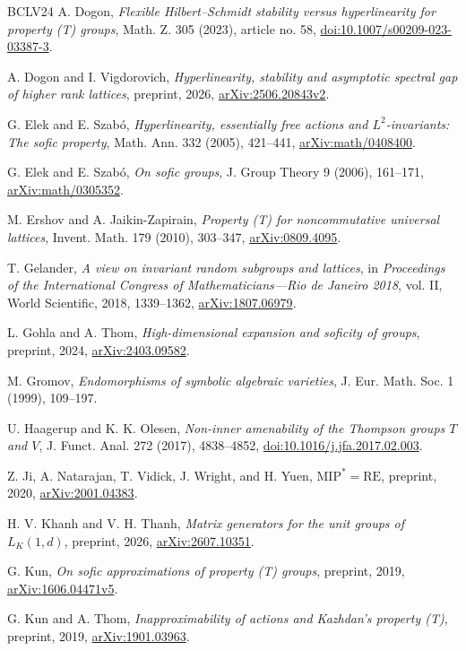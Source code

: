 \documentclass[10pt]{article}
\begin{document}
\begin{thebibliography}{BCLV24}
A. Dogon, \emph{Flexible Hilbert--Schmidt stability versus hyperlinearity for property (T) groups}, Math. Z. 305 (2023), article no. 58, \url{doi:10.1007/s00209-023-03387-3}.

A. Dogon and I. Vigdorovich, \emph{Hyperlinearity, stability and asymptotic spectral gap of higher rank lattices}, preprint, 2026, \url{arXiv:2506.20843v2}.

G. Elek and E. Szabó, \emph{Hyperlinearity, essentially free actions and $L^2$-invariants: The sofic property}, Math. Ann. 332 (2005), 421--441, \url{arXiv:math/0408400}.

G. Elek and E. Szabó, \emph{On sofic groups}, J. Group Theory 9 (2006), 161--171, \url{arXiv:math/0305352}.

M. Ershov and A. Jaikin-Zapirain, \emph{Property (T) for noncommutative universal lattices}, Invent. Math. 179 (2010), 303--347, \url{arXiv:0809.4095}.

T. Gelander, \emph{A view on invariant random subgroups and lattices}, in \emph{Proceedings of the International Congress of Mathematicians---Rio de Janeiro 2018}, vol. II, World Scientific, 2018, 1339--1362, \url{arXiv:1807.06979}.

L. Gohla and A. Thom, \emph{High-dimensional expansion and soficity of groups}, preprint, 2024, \url{arXiv:2403.09582}.

M. Gromov, \emph{Endomorphisms of symbolic algebraic varieties}, J. Eur. Math. Soc. 1 (1999), 109--197.

U. Haagerup and K. K. Olesen, \emph{Non-inner amenability of the Thompson groups $T$ and $V$}, J. Funct. Anal. 272 (2017), 4838--4852, \url{doi:10.1016/j.jfa.2017.02.003}.

Z. Ji, A. Natarajan, T. Vidick, J. Wright, and H. Yuen, \emph{$\mathrm{MIP}^{\ast}=\mathrm{RE}$}, preprint, 2020, \url{arXiv:2001.04383}.

H. V. Khanh and V. H. Thanh, \emph{Matrix generators for the unit groups of $L_K(1,d)$}, preprint, 2026, \url{arXiv:2607.10351}.

G. Kun, \emph{On sofic approximations of property (T) groups}, preprint, 2019, \url{arXiv:1606.04471v5}.

G. Kun and A. Thom, \emph{Inapproximability of actions and Kazhdan's property (T)}, preprint, 2019, \url{arXiv:1901.03963}.


\end{thebibliography}
\end{document}
